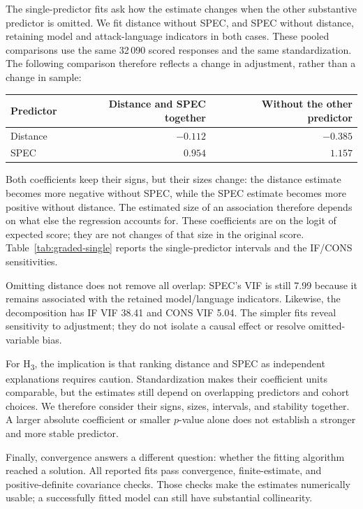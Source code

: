 The single-predictor fits ask how the estimate changes when the other substantive predictor is omitted. We fit distance without SPEC, and SPEC without distance, retaining model and attack-language indicators in both cases. These pooled comparisons use the same 32\,090 scored responses and the same standardization. The following comparison therefore reflects a change in adjustment, rather than a change in sample:

\begin{center}
\small
\begin{tabular}{lrr}
\toprule
Predictor & Distance and SPEC together & Without the other predictor \\
\midrule
Distance & $-0.112$ & $-0.385$ \\
SPEC & $0.954$ & $1.157$ \\
\bottomrule
\end{tabular}
\end{center}

Both coefficients keep their signs, but their sizes change: the distance estimate becomes more negative without SPEC, while the SPEC estimate becomes more positive without distance. The estimated size of an association therefore depends on what else the regression accounts for. These coefficients are on the logit of expected score; they are not changes of that size in the original score. Table~\ref{tab:graded-single} reports the single-predictor intervals and the IF/CONS sensitivities.

Omitting distance does not remove all overlap: SPEC's VIF is still 7.99 because it remains associated with the retained model/language indicators. Likewise, the decomposition has IF VIF 38.41 and CONS VIF 5.04. The simpler fits reveal sensitivity to adjustment; they do not isolate a causal effect or resolve omitted-variable bias.

For H\textsubscript{3}, the implication is that ranking distance and SPEC as independent explanations requires caution. Standardization makes their coefficient units comparable, but the estimates still depend on overlapping predictors and cohort choices. We therefore consider their signs, sizes, intervals, and stability together. A larger absolute coefficient or smaller $p$-value alone does not establish a stronger and more stable predictor.

Finally, convergence answers a different question: whether the fitting algorithm reached a solution. All reported fits pass convergence, finite-estimate, and positive-definite covariance checks. Those checks make the estimates numerically usable; a successfully fitted model can still have substantial collinearity.

